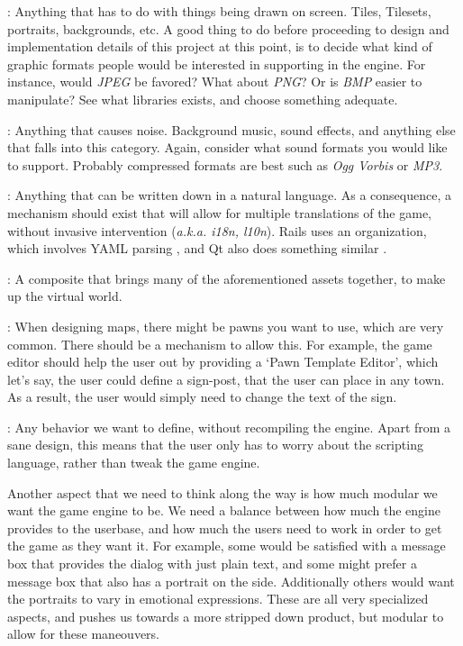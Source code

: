 \begin{description}
  : Anything that has to do with things being drawn on screen.
    Tiles, Tilesets, portraits, backgrounds, etc. A good thing to do before
    proceeding to design and implementation details of this project at this
    point, is to decide what kind of graphic formats people would be interested
    in supporting in the engine. For instance, would \textit{JPEG} be favored?
    What about \textit{PNG}? Or is \textit{BMP} easier to manipulate? See what
    libraries exists, and choose something adequate.

  : Anything that causes noise. Background music, sound effects, and
    anything else that falls into this category. Again, consider what sound
    formats you would like to support. Probably compressed formats are best such
    as \textit{Ogg Vorbis} or \textit{MP3}.

  : Anything that can be written down in a natural language. As a
    consequence, a mechanism should exist that will allow for multiple
    translations of the game, without invasive intervention (\textit{a.k.a.
    i18n, l10n}). Rails uses an organization, which involves YAML parsing
    \cite{ruby:i18n}, and Qt also does something similar \cite{qt:i18n}.

  : A composite that brings many of the aforementioned assets
    together, to make up the virtual world.

  : When designing maps, there might be pawns you want to
    use, which are very common. There should be a mechanism to allow this. For
    example, the game editor should help the user out by providing a `Pawn
    Template Editor', which let's say, the user could define a sign-post, that
    the user can place in any town. As a result, the user would simply need to
    change the text of the sign.

  : Any behavior we want to define, without recompiling the
    engine. Apart from a sane design, this means that the user only has to worry
    about the scripting language, rather than tweak the game engine.
\end{description}

Another aspect that we need to think along the way is how much modular we want
the game engine to be. We need a balance between how much the engine provides
to the userbase, and how much the users need to work in order to get the game
as they want it. For example, some would be satisfied with a message box that
provides the dialog with just plain text, and some might prefer a message box
that also has a portrait on the side. Additionally others would want the
portraits to vary in emotional expressions. These are all very specialized
aspects, and pushes us towards a more stripped down product, but modular to
allow for these maneouvers.

